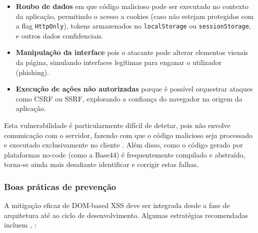 \begin{itemize}
    \item \textbf{Roubo de dados} em que código malicioso pode ser executado no contexto da aplicação, permitindo o acesso a cookies (caso não estejam protegidos com a flag \texttt{HttpOnly}), tokens armazenados no \texttt{localStorage} ou \texttt{sessionStorage}, e outros dados confidenciais.
    
    \item \textbf{Manipulação da interface} pois o atacante pode alterar elementos visuais da página, simulando interfaces legítimas para enganar o utilizador (phishing).
    
    \item \textbf{Execução de ações não autorizadas} porque é possível orquestrar ataques como CSRF ou SSRF, explorando a confiança do navegador na origem da aplicação.
\end{itemize}

Esta vulnerabilidade é particularmente difícil de detetar, pois não envolve comunicação com o servidor, fazendo com que o código malicioso seja processado e executado exclusivamente no cliente \cite{ref39}. Além disso, como o código gerado por plataformas no-code (como a Base44) é frequentemente compilado e abstraído, torna-se ainda mais desafiante identificar e corrigir estas falhas.

\subsubsection{Boas práticas de prevenção}
\label{subsubsec:boas-praticas-prevencao-dom-xss}

A mitigação eficaz de DOM-based XSS deve ser integrada desde a fase de arquitetura até ao ciclo de desenvolvimento. Algumas estratégias recomendadas incluem \cite{ref40}, \cite{ref41}:


